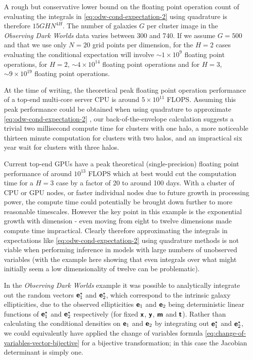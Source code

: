 A rough but conservative lower bound on the floating point operation count of evaluating the integrals in \eqref{eq:odw-cond-expectation-2} using quadrature is therefore $15 GH N^{4H}$. The number of galaxies $G$ per cluster image in the \emph{Observing Dark Worlds} data varies between 300 and 740. If we assume $G=500$ and that we use only $N=20$ grid points per dimension, for the $H=2$ cases evaluating the conditional expectation will involve $\sim 1\times 10^9$ floating point operations, for $H=2$, $\sim 4 \times 10^{14}$ floating point operations and for $H=3$, $\sim 9\times 10^{19}$ floating point operations.

At the time of writing, the theoretical peak floating point operation performance of a top-end multi-core server \ac{CPU} is around $5 \times 10^{11}$ \ac{FLOPS}. Assuming this peak performance could be obtained when using quadrature to approximate \eqref{eq:odw-cond-expectation-2}
, our back-of-the-envelope calculation suggests a trivial two millisecond compute time for clusters with one halo, a more noticeable thirteen minute computation for clusters with two halos, and an impractical six year wait for clusters with three halos.

Current top-end \acp{GPU} have a peak theoretical (single-precision) floating point performance of around $10^{13}$ \ac{FLOPS} which at best would cut the computation time for a $H=3$ case by a factor of 20 to around 100 days. With a cluster of \ac{CPU} or \ac{GPU} nodes, or faster individual nodes due to future growth in processing power, the compute time could potentially be brought down further to more reasonable timescales. However the key point in this example is the exponential growth with dimension - even moving from eight to twelve dimensions made compute time impractical. Clearly therefore approximating the integrals in expectations like \eqref{eq:odw-cond-expectation-2} using quadrature methods is not viable when performing inference in models with large numbers of unobserved variables (with the example here showing that even integrals over what might initially seem a low dimensionality of twelve can be problematic).

In the \emph{Observing Dark Worlds} example it was possible to analytically integrate out the random vectors $\boldsymbol{\mathsf{e}}_1^\star$ and $\boldsymbol{\mathsf{e}}_2^\star$, which correspond to the intrinsic galaxy ellipticities, due to the observed ellipticities $\boldsymbol{\mathsf{e}}_1$ and $\boldsymbol{\mathsf{e}}_2$ being deterministic linear functions of $\boldsymbol{\mathsf{e}}_1^\star$ and $\boldsymbol{\mathsf{e}}_2^\star$ respectively (for fixed $\boldsymbol{\mathsf{x}}$, $\boldsymbol{\mathsf{y}}$, $\boldsymbol{\mathsf{m}}$ and $\boldsymbol{\mathsf{t}}$). Rather than calculating the conditional densities on $\boldsymbol{\mathsf{e}}_1$ and $\boldsymbol{\mathsf{e}}_2$ by integrating out $\boldsymbol{\mathsf{e}}_1^\star$ and $\boldsymbol{\mathsf{e}}_2^\star$, we could equivalently have applied the change of variables formula \eqref{eq:change-of-variables-vector-bijective} for a bijective transformation; in this case the Jacobian determinant is simply one.

